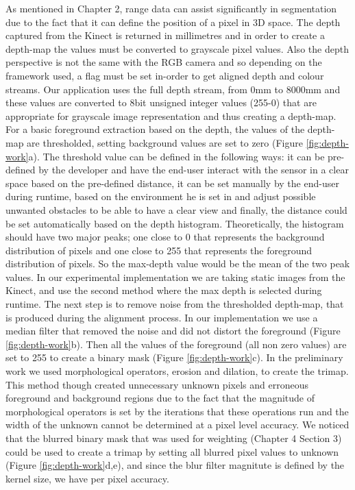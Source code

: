 As mentioned in Chapter 2, range data can assist significantly in segmentation due to the fact that it can define the position of a pixel in 3D space. 
The depth captured from the Kinect is returned in millimetres and in order to create a depth-map the values must be converted to grayscale pixel values. Also the depth perspective is not the same with the RGB camera and so depending on the framework used, a flag must be set in-order to get aligned depth and colour streams.
Our application uses the full depth stream, from 0mm to 8000mm and these values are converted to 8bit unsigned integer values (255-0) that are appropriate for grayscale image representation and thus creating a depth-map.
For a basic foreground extraction based on the depth, the values of the depth-map are thresholded, setting background values are set to zero (Figure \ref{fig:depth-work}a). The threshold value can be defined in the following ways: it can be pre-defined by the developer and have the end-user interact with the sensor in a clear space based on the pre-defined distance, it can be set manually by the end-user during runtime, based on the environment he is set in and adjust possible unwanted obstacles to be able to have a clear view and finally, the distance could be set automatically based on the depth histogram. Theoretically, the histogram should have two major peaks; one close to 0 that represents the background distribution of pixels and one close to 255 that represents the foreground distribution of pixels. So the max-depth value would be the mean of the two peak values. In our experimental implementation we are taking static images from the Kinect, and use the second method where the max depth is selected during runtime.
The next step is to remove noise from the thresholded depth-map, that is produced during the alignment process. In our implementation we use a median filter that removed the noise and did not distort the foreground (Figure \ref{fig:depth-work}b).
Then all the values of the foreground (all non zero values) are set to 255 to create a binary mask (Figure \ref{fig:depth-work}c). In the preliminary work we used morphological operators, erosion and dilation, to create the trimap. This method though created unnecessary unknown pixels and erroneous foreground and background regions due to the fact that the magnitude of morphological operators is set by the iterations that these operations run and the width of the unknown cannot be determined at a pixel level accuracy. We noticed that the blurred binary mask that was used for weighting (Chapter 4 Section 3) could be used to create a trimap by setting all blurred pixel values to unknown (Figure \ref{fig:depth-work}d,e), and since the blur filter magnitute is defined by the kernel size, we have per pixel accuracy.

